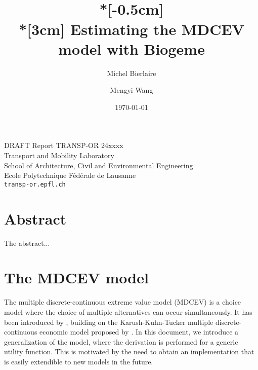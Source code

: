 \documentclass[12pt,a4paper]{article}
\title{
  \vspace{-3cm}
  \epsfig{figure=transp-or.eps,height=2cm}
  \hfill
  \epsfig{figure=epfl,height=1.5cm}   \\*[-0.5cm]
  \mbox{}\hrulefill\mbox{} \\*[3cm] Estimating the MDCEV model with Biogeme}
\author{Michel Bierlaire \and Mengyi Wang}
\date{\today}
\begin{document}
\begin{titlepage}
\pagestyle{empty}

\maketitle
\vspace{2cm}


\begin{center}
  DRAFT
\small Report TRANSP-OR 24xxxx \\ Transport and Mobility Laboratory \\ School of Architecture, Civil and Environmental Engineering \\ Ecole Polytechnique F\'ed\'erale de Lausanne \\ \verb+transp-or.epfl.ch+
\end{center}


\end{titlepage}


\section*{Abstract}

The abstract...
\section{The MDCEV model}

The multiple discrete-continuous extreme value model (MDCEV) is a
choice model where the choice of multiple alternatives can occur
simultaneously. It has been introduced by ,
building on the Karush-Kuhn-Tucker multiple discrete-continuous economic
model proposed by . In this document, we introduce a generalization of the model, where the derivation is performed for a generic utility function. This is motivated by the need to obtain an implementation that is easily extendible to new models in the future.
\end{document}
